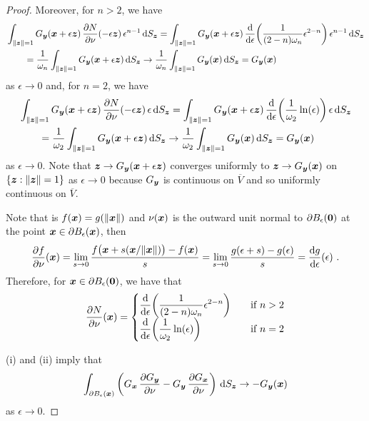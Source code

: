 \begin{proof}
Moreover, for $n>2$, we have
\begin{align*}
&\int_{\|{\bm{z}}\|=1}
G_{{\bm{y}}}({\bm{x}}+\epsilon {\bm{z}})
\,\frac{\partial{N}}{\partial \nu}(-\epsilon {\bm{z}}) \, \epsilon^{n-1}\,\mathrm{d}{S}_{{\bm{z}}}
= \int_{\|{\bm{z}}\|=1} G_{{\bm{y}}}({\bm{x}}+\epsilon {\bm{z}})
\,\frac{\mathrm{d}}{\mathrm{d}{\epsilon}}{ \left(\frac{1}{(2-n)\omega_n} \epsilon^{2-n}\right) }
\, \epsilon^{n-1}\,\mathrm{d}{S}_{{\bm{z}}} \\
&\qquad = \frac{1}{\omega_n} \int_{\|{\bm{z}}\|=1}
G_{{\bm{y}}}({\bm{x}}+\epsilon {\bm{z}}) \,\mathrm{d}{S}_{{\bm{z}}}
\to 
\frac{1}{\omega_n} \int_{\|{\bm{z}}\|=1} G_{{\bm{y}}}({\bm{x}}) \,\mathrm{d}{S}_{{\bm{z}}}
= G_{{\bm{y}}}({\bm{x}})
\end{align*}
as $\epsilon \to 0$ and, for $n=2$, we have
\begin{align*}
&\int_{\|{\bm{z}}\|=1}
G_{{\bm{y}}}({\bm{x}}+\epsilon {\bm{z}})
\,\frac{\partial{N}}{\partial \nu}(-\epsilon {\bm{z}}) \, \epsilon \,\mathrm{d}{S}_{{\bm{z}}}
= \int_{\|{\bm{z}}\|=1} G_{{\bm{y}}}({\bm{x}}+\epsilon {\bm{z}})
\,\frac{\mathrm{d}}{\mathrm{d}{\epsilon}}{ \left(\frac{1}{\omega_2} \ln(\epsilon) \right) }
\, \epsilon \,\mathrm{d}{S}_{{\bm{z}}} \\
& \qquad = \frac{1}{\omega_2} \int_{\|{\bm{z}}\|=1}
G_{{\bm{y}}}({\bm{x}}+\epsilon {\bm{z}}) \,\mathrm{d}{S}_{{\bm{z}}}
\to
\frac{1}{\omega_2} \int_{\|{\bm{z}}\|=1} G_{{\bm{y}}}({\bm{x}}) \,\mathrm{d}{S}_{{\bm{z}}}
= G_{{\bm{y}}}({\bm{x}})
\end{align*}
as $\epsilon \to 0$.
Note that ${\bm{z}} \to G_{{\bm{y}}}({\bm{x}}+\epsilon {\bm{z}})$
converges uniformly to ${\bm{z}} \to G_{{\bm{y}}}({\bm{x}})$ on
$\{ {\bm{z}} : \|{\bm{z}}\| = 1\}$ as $\epsilon \to 0$ because
$G_{{\bm{y}}}$ is continuous on $\overline{V}$ and so uniformly continuous
on $\overline{V}$.

Note that is $f({\bm{x}}) = g(\|{\bm{x}}\|)$ and $\nu({\bm{x}})$ is
the outward unit normal to $\partial B_\epsilon({\bm{0}})$ at the point
${\bm{x}} \in \partial B_\epsilon({\bm{x}})$, then
\[
\frac{\partial{f}}{\partial \nu}({\bm{x}}) = \lim_{s\to 0}
\frac{f\big({\bm{x}} + s({\bm{x}}/\|{\bm{x}}\|)\big) - f({\bm{x}})}{s}
= \lim_{s\to 0} \frac{g(\epsilon + s) - g(\epsilon)}{s}
= \frac{\mathrm{d}g}{\mathrm{d}{\epsilon}}(\epsilon) \ .
\]
Therefore, for ${\bm{x}} \in \partial B_\epsilon({\bm{0}})$, we have
that
\[
\frac{\partial{N}}{\partial \nu}({\bm{x}})
= \begin{cases}
\displaystyle
\frac{\mathrm{d}}{\mathrm{d}{\epsilon}}{ \left(\frac{1}{(2-n)\omega_n} \epsilon^{2-n}\right) }
& \quad \text{if} \ n>2 \\
\displaystyle
\frac{\mathrm{d}}{\mathrm{d}{\epsilon}}{ \left(\frac{1}{\omega_2} \ln(\epsilon) \right) }
&\quad \text{if} \ n = 2
\end{cases}
\]

(i) and (ii) imply that 
\begin{equation} \label{laplace_GequG_two_A}
\int_{\partial B_{\epsilon}({\bm{x}})}
\left( G_{{\bm{x}}}\,\frac{\partial{G_{{\bm{y}}}}}{\partial \nu} 
- G_{{\bm{y}}}\,\frac{\partial{G_{{\bm{x}}}}}{\partial \nu} \right) \,\mathrm{d}{S}_{{\bm{z}}}
\to -G_{{\bm{y}}}({\bm{x}})
\end{equation}
as $\epsilon \to 0$.


\end{proof}
